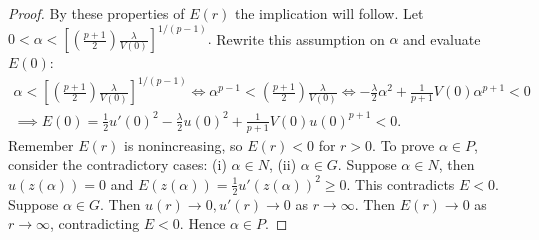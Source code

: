 \begin{lemma}
\begin{proof}
By these properties of $E(r)$ the implication will follow. Let $0<\alpha<\left[\left(\frac{p+1}{2}\right)\frac{\lambda}{V(0)} \right]^{1/(p-1)}.$ Rewrite this assumption on $\alpha$ and evaluate $E(0)$: \begin{gather*}\alpha<\left[\left(\frac{p+1}{2}\right)\frac{\lambda}{V(0)} \right]^{1/(p-1)}\iff\alpha^{p-1}<\left(\frac{p+1}{2}\right)\frac{\lambda}{V(0)}\iff
-\frac{\lambda}{2}\alpha^2+\frac{1}{p+1}V(0)\alpha^{p+1}<0\\\implies E(0)=\frac{1}{2}u'(0)^2-\frac{\lambda}{2}u(0)^2+\frac{1}{p+1}V(0)u(0)^{p+1}<0.\end{gather*} Remember $E(r)$ is nonincreasing, so $E(r)<0$ for $r>0$. To prove $\alpha\in P$, consider the contradictory cases: (i) $\alpha\in N$, (ii) $\alpha\in G$. Suppose $\alpha\in N$, then $u(z(\alpha))=0$ and $E(z(\alpha))=\frac{1}{2}u'(z(\alpha))^2\geq0$. This contradicts $E<0$. Suppose $\alpha\in G$. Then $u(r)\to0,u'(r)\to0$ as $r\to\infty$. Then $E(r)\to0$ as $r\to\infty$, contradicting $E<0$. Hence $\alpha\in P$.
\end{proof}
\end{lemma}
